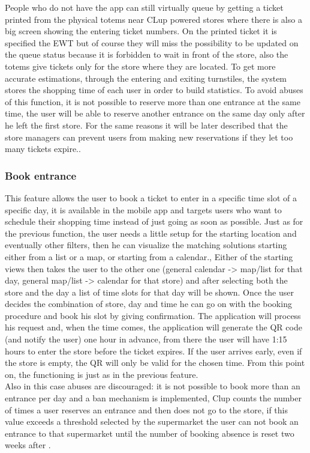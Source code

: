 People who do not have the app can still virtually queue by getting a ticket printed from the physical totems near CLup powered stores where there is also a big screen showing the entering ticket numbers. On the printed ticket it is specified the EWT but of course they will miss the possibility to be updated on the queue status because it is forbidden to wait in front of the store, also the totems give tickets only for the store where they are located.
To get more accurate estimations, through the entering and exiting turnstiles, the system stores the shopping time of each user in order to build statistics. 
To avoid abuses of this function, it is not possible to reserve more than one entrance at the same time, the user will be able to reserve another entrance on the same day only after he left the first store. For the same reasons it will be later described that the store managers can prevent users from making new reservations if they let too many tickets expire..


\subsubsection{Book entrance}
This feature allows the user to book a ticket to enter in a specific time slot of a specific day, it is available in the mobile app and targets users who want to schedule their shopping time instead of just going as soon as possible. Just as for the previous function, the user needs a little setup for the starting location and eventually other filters, then he can visualize the matching solutions starting either from a list or a map, or starting from a calendar., Either of the starting views then takes the user to the other one (general calendar -> map/list for that day,  general map/list -> calendar for that store) and after selecting both the store and the day a list of time slots for that day will be shown. Once the user decides the combination of store, day and time he can go on with the booking procedure and book his slot by giving confirmation. The application will process his request and, when the time comes, the application will generate the QR code (and notify the user) one hour in advance, from there the user will have 1:15 hours to enter the store before the ticket expires. If the user arrives early, even if the store is empty, the QR will only be valid for the chosen time. From this point on, the functioning is just as in the previous feature.\\
Also in this case abuses are discouraged: it is not possible to book more than an entrance per day and a ban mechanism is implemented, Clup counts the number of times a user reserves an entrance and then does not go to the store, if this value exceeds a threshold selected by the supermarket the user can not book an entrance to that supermarket until the number of booking absence is reset two weeks after  .

